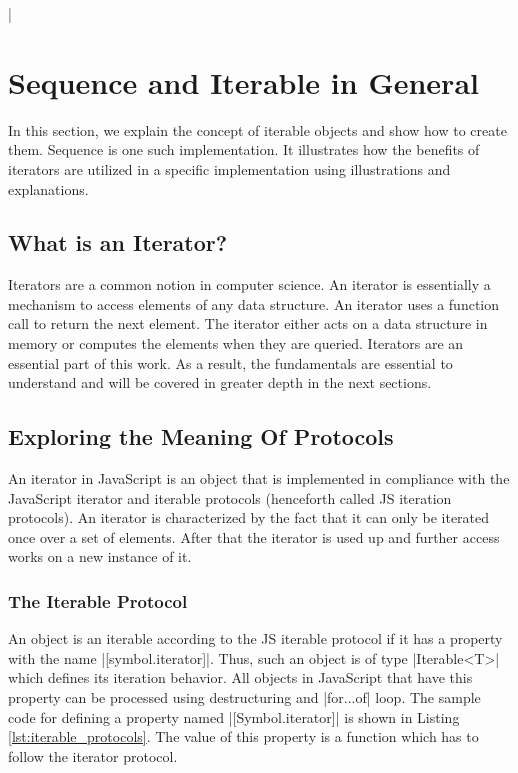 \lstMakeShortInline[columns=fixed]|
\section{Sequence and Iterable in General}
In this section, we explain the concept of iterable objects and show how to 
create them. Sequence is one such implementation. It illustrates how the 
benefits of iterators are utilized in a specific implementation using 
illustrations and explanations.

\subsection{What is an Iterator?}
Iterators are a common notion in computer science. An iterator is essentially 
a mechanism to access elements of any data structure. An iterator uses a 
function call to return the next element. The iterator either acts on a data 
structure in memory or computes the elements when they are queried. Iterators 
are an essential part of this work. As a result, the fundamentals are essential 
to understand and will be covered in greater depth in the next sections.


\subsection{Exploring the Meaning Of Protocols}
An iterator in JavaScript is an object that is implemented in compliance with
the JavaScript iterator and iterable protocols \cite{noauthor_iteration_2023}
(henceforth called JS iteration protocols). An iterator is characterized by the
fact that it can only be iterated once over a set of elements. After that the
iterator is used up and further access works on a new instance of it.


\subsubsection{The Iterable Protocol}
An object is an iterable according to the JS iterable protocol if it has a
property with the name |[symbol.iterator]|. Thus, such an object is of type
|Iterable<T>| which defines its iteration behavior. All objects in JavaScript
that have this property can be processed using destructuring and |for...of|
loop. The sample code for defining a property named |[Symbol.iterator]| is shown
in Listing \ref{lst:iterable_protocols}. The value of this property is a
function which has to follow the iterator protocol.

